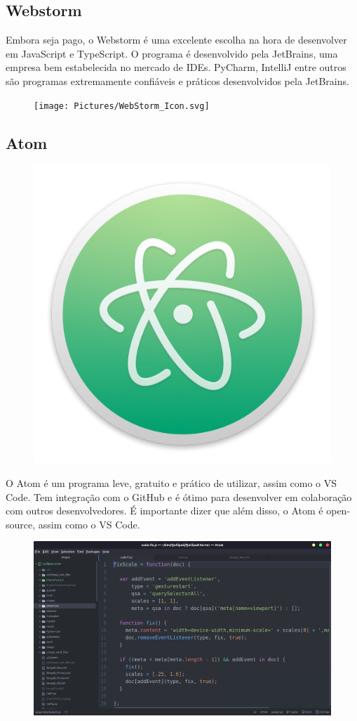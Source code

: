    \subsection{Webstorm}
    Embora seja pago, o Webstorm é uma excelente escolha na hora de desenvolver em JavaScript e TypeScript. O programa é desenvolvido pela JetBrains, uma empresa bem estabelecida no mercado de IDEs. PyCharm, IntelliJ entre outros são programas extremamente confiáveis e práticos desenvolvidos pela JetBrains.
    
	
\begin{figure}[H]
	\centering
	\texttt{[image: Pictures/WebStorm\_Icon.svg]}
	\caption{}
	\label{fig:webstormicon}
\end{figure}

	\subsection{Atom}
	\begin{figure}[H]
		\centering
		\includegraphics[width=0.2\linewidth]{Pictures/Atom_1.0_icon}
		\caption{}
		\label{fig:atom1}
	\end{figure}
	O Atom é um programa leve, gratuito e prático de utilizar, assim como o VS Code. Tem integração com o GitHub e é ótimo para desenvolver em colaboração com outros desenvolvedores. É importante dizer que além disso, o Atom é open-source, assim como o VS Code.
	
	\begin{figure}[H]
		\centering
		\includegraphics[width=0.7\linewidth]{Pictures/AtomIDE}
		\caption{}
		\label{fig:atomide}
	\end{figure}
	
